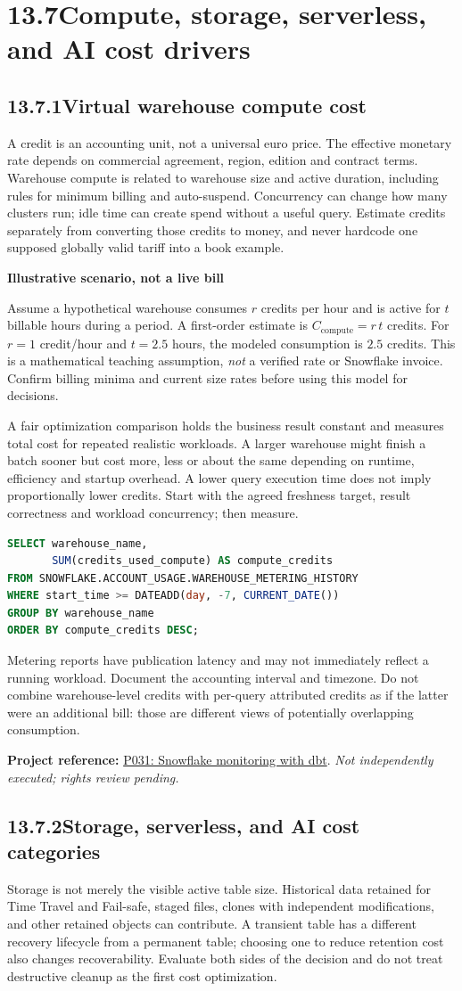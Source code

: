 \documentclass[11pt,twoside]{article}
\newcommand{\topic}[2]{\subsection*{#1\quad #2}}
\newcommand{\repo}[2]{\par\begingroup\fontsize{8.0}{9.6}\selectfont\sffamily\color{inkgray}\textbf{Project reference:} \href{#2}{#1}. \textit{Not independently executed; rights review pending.}\par\endgroup}
\begin{document}
\section*{13.7\quad Compute, storage, serverless, and AI cost drivers}
\topic{13.7.1}{Virtual warehouse compute cost}
A credit is an accounting unit, not a universal euro price. The effective monetary rate depends on commercial agreement, region, edition and contract terms. Warehouse compute is related to warehouse size and active duration, including rules for minimum billing and auto-suspend. Concurrency can change how many clusters run; idle time can create spend without a useful query. Estimate credits separately from converting those credits to money, and never hardcode one supposed globally valid tariff into a book example.
\begin{whitebox}\textbf{Illustrative scenario, not a live bill}\par
Assume a hypothetical warehouse consumes $r$ credits per hour and is active for $t$ billable hours during a period. A first-order estimate is $C_{\mathrm{compute}}=r\,t$ credits. For $r=1$ credit/hour and $t=2.5$ hours, the modeled consumption is $2.5$ credits. This is a mathematical teaching assumption, \emph{not} a verified rate or Snowflake invoice. Confirm billing minima and current size rates before using this model for decisions.
\end{whitebox}
A fair optimization comparison holds the business result constant and measures total cost for repeated realistic workloads. A larger warehouse might finish a batch sooner but cost more, less or about the same depending on runtime, efficiency and startup overhead. A lower query execution time does not imply proportionally lower credits. Start with the agreed freshness target, result correctness and workload concurrency; then measure.
\begin{lstlisting}[language=SQL,caption={Read-only warehouse metering; approved account-usage rights.}]
SELECT warehouse_name,
       SUM(credits_used_compute) AS compute_credits
FROM SNOWFLAKE.ACCOUNT_USAGE.WAREHOUSE_METERING_HISTORY
WHERE start_time >= DATEADD(day, -7, CURRENT_DATE())
GROUP BY warehouse_name
ORDER BY compute_credits DESC;
\end{lstlisting}
Metering reports have publication latency and may not immediately reflect a running workload. Document the accounting interval and timezone. Do not combine warehouse-level credits with per-query attributed credits as if the latter were an additional bill: those are different views of potentially overlapping consumption.
\repo{P031: Snowflake monitoring with dbt}{https://github.com/get-select/dbt-snowflake-monitoring}
\newpage
\topic{13.7.2}{Storage, serverless, and AI cost categories}
Storage is not merely the visible active table size. Historical data retained for Time Travel and Fail-safe, staged files, clones with independent modifications, and other retained objects can contribute. A transient table has a different recovery lifecycle from a permanent table; choosing one to reduce retention cost also changes recoverability. Evaluate both sides of the decision and do not treat destructive cleanup as the first cost optimization.
\end{document}
